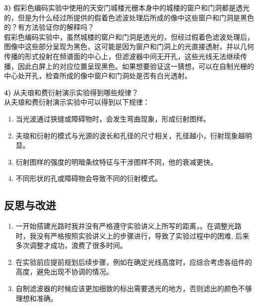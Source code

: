 \documentclass[zihao=5, UTF8]{article}
\theoremstyle{MyLineTheoremStyle} %
\theoremstyle{MyBlockTheoremStyle} %
\theoremstyle{MySubsubsectionStyle} %
\begin{document}
\textbf{3)} 假彩色编码实验中使用的天安门城楼光栅本身中的城楼的窗户和门洞都是透光的，但是为什么经过所提供的假着色滤波处理后所成的像中这些窗户和门洞是黑色的？有方法验证你的解释吗？\\
\indent 假彩色编码实验中，虽然城楼的窗户和门洞是透光的，但经过假着色滤波处理后，图像中这些部分呈现为黑色，这可能是因为窗户和门洞上的光直接透射，并以几何传播的形式投射在频谱面的中心上，但滤波器中间无开孔，这些光线无法继续传播，因此白屏上的对应位置呈现黑色。如果想要验证这一猜想，可以在自制光栅的中心处开孔，检查所成的像中窗户和门洞处是否有白光透射。

\textbf{4)} 从夫琅和费衍射演示实验得到哪些规律？\\
\indent 从夫琅和费衍射演示实验中可以得到以下规律：
\begin{enumerate}
    \item 当光波通过狭缝或障碍物时，会发生弯曲现象，形成衍射图样。
    \item 夫琅和衍射的模式与光源的波长和孔径的尺寸相关，孔径越小，衍射现象越明显。
    \item 衍射图样的强度的明暗条纹特征与干涉图样不同，他的衰减更快。
    \item 不同形状的孔或障碍物会导致不同的衍射模式。 
\end{enumerate}

\subsection{反思与改进}

\begin{enumerate}
    \item 一开始搭建光路时我并没有严格遵守实验讲义上所写的距离，。在调整光路时，我没有严格按照实验讲义上的步骤进行，导致了实验过程中的困难, 后来多次调整才成功，浪费了很多时间。
    \item 在实验前应提前规划后续步骤，例如在确定光线高度时，应综合考虑各组件的高度，避免出现不协调的情况。
    \item 自制滤波器的时候应该更加细致的标出需要透光的地方，否则滤出的颜色不够理想和准确。
\end{enumerate}
\end{document}
